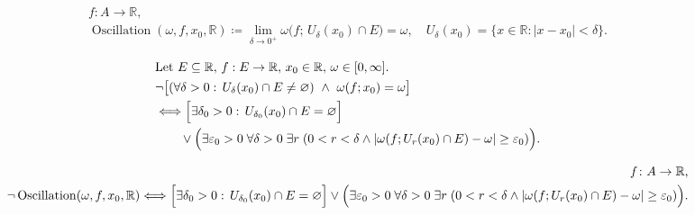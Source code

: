 \begin{remark*}
\[
\begin{aligned}
  f\colon A\to\mathbb{R},\\
\operatorname{Oscillation}(\omega,f,x_0,\mathbb{R}) \coloneqq
\lim_{\delta \to 0^+} \omega\bigl(f;\,U_\delta(x_0)\cap E\bigr) = \omega,
\quad U_\delta(x_0)=\{x \in \mathbb{R}: |x-x_0|<\delta\}.
\end{aligned}
\]
\end{remark*}

\begin{remark*}
\[
\begin{aligned}
&\text{Let } E \subseteq \mathbb{R},\, f:E \to \mathbb{R},\, x_0 \in \mathbb{R},\, \omega \in [0,\infty].\\
&\neg\bigl[(\forall \delta>0:\, U_\delta(x_0)\cap E \neq \varnothing)\ \land\ \omega(f;x_0)=\omega\bigr]\\
&\Longleftrightarrow
\Bigl[\exists \delta_0>0:\, U_{\delta_0}(x_0)\cap E = \varnothing\Bigr]\\
&\qquad\lor
\Bigl(\exists \varepsilon_0>0\; \forall \delta>0\; \exists r\;(0<r<\delta \land |\omega(f;U_r(x_0)\cap E)-\omega| \ge \varepsilon_0)\Bigr).
\end{aligned}
\]
\end{remark*}

\begin{remark*}
\[
\begin{aligned}
  f\colon A\to\mathbb{R},\\
\neg\operatorname{Oscillation}(\omega,f,x_0,\mathbb{R})
\Longleftrightarrow
\Bigl[\exists \delta_0>0:\, U_{\delta_0}(x_0)\cap E = \varnothing\Bigr]
\lor
\Bigl(\exists \varepsilon_0>0\; \forall \delta>0\; \exists r\;(0<r<\delta \land |\omega(f;U_r(x_0)\cap E)-\omega| \ge \varepsilon_0)\Bigr).
\end{aligned}
\]
\end{remark*}


